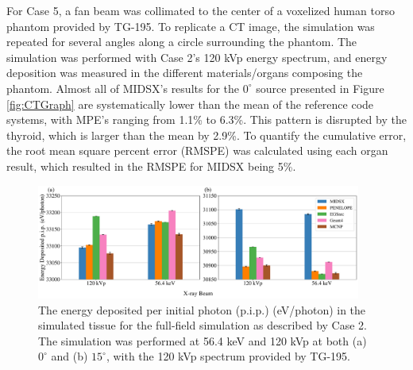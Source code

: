 \par For Case 5, a fan beam was collimated to the center of a voxelized human torso phantom provided by TG-195. To replicate a CT image, the simulation was repeated for several angles along a circle surrounding the phantom. The simulation was performed with Case 2's 120 kVp energy spectrum, and energy deposition was measured in the different materials/organs composing the phantom. Almost all of MIDSX's results for the $0^\circ$ source presented in Figure \ref{fig:CTGraph} are systematically lower than the mean of the reference code systems, with MPE's ranging from 1.1\% to 6.3\%. This pattern is disrupted by the thyroid, which is larger than the mean by 2.9\%. To quantify the cumulative error, the root mean square percent error (RMSPE) was calculated using each organ result, which resulted in the RMSPE for MIDSX being 5\%.   



\begin{figure}[H]
    \centering
	\includegraphics[width=0.95\textwidth]{../figures/radiography_body_dep_paper_ready.pdf}
	\caption{The energy deposited per initial photon (p.i.p.) (eV/photon) in the simulated tissue for the full-field simulation as described by Case 2. The simulation was performed at 56.4 keV and 120 kVp at both (a) $0^\circ$ and (b) $15^\circ$, with the 120 kVp spectrum provided by TG-195.}
 	\label{fig:BDGraph}
\end{figure}




